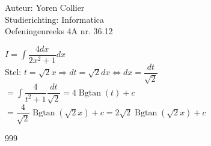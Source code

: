 \documentclass[a4paper]{article}
\newcommand{\asa}{\Leftrightarrow} %
\newcommand{\adR}{\Rightarrow} %
\newcommand{\Lh}{\left(} %
\newcommand{\Rh}{\right)}
\newcommand{\intgrl}{\displaystyle\int} %
\begin{document}
\noindent \large Auteur: Yoren Collier \\
\noindent \large Studierichting: Informatica\\
\noindent \large Oefeningenreeks 4A nr. 36.12\\

\medskip

\normalsize

$ I =  \intgrl \dfrac{4dx}{2x^2 +1} dx$\\

Stel: $t = \sqrt{2}x \adR dt = \sqrt{2} dx \asa  dx = \dfrac{dt}{\sqrt{2}} $\\

$= \intgrl \dfrac{4}{t^2 +1} \dfrac{dt}{\sqrt{2}} = 4 \operatorname{Bgtan} \Lh t \Rh +c$\\

$= \dfrac{4}{\sqrt{2}} \operatorname{Bgtan} \Lh \sqrt{2}x \Rh +c = 2\sqrt{2} \operatorname{Bgtan} \Lh \sqrt{2}x \Rh +c$\\

\begin{thebibliography}{999}
\end{thebibliography}
\end{document}
